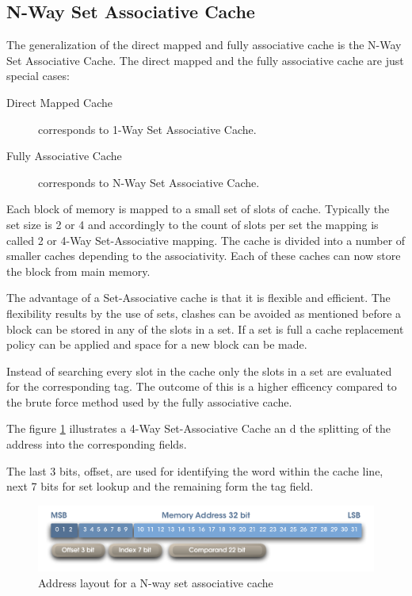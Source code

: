 \documentclass[DIV10, abstracton, openright, footsepline, headsepline, twoside, 9pt,
bigheadings]{scrreprt}
\begin{document}
\subsection{N-Way Set Associative Cache}
The generalization of the direct mapped and fully associative cache is the N-Way
Set Associative Cache. The direct mapped and the fully associative cache are
just special cases:
\begin{description}
\item[Direct Mapped Cache] corresponds to 1-Way Set Associative Cache.
\item[Fully Associative Cache] corresponds to N-Way Set Associative Cache.
\end{description}
Each block of memory is mapped to a small set of slots of cache.
Typically the set size is 2 or 4 and accordingly to the count of slots per set
the mapping is called 2 or 4-Way Set-Associative mapping. The cache is divided
into a number of smaller caches depending to the associativity. Each of these
caches can now store the block from main memory.

The advantage of a Set-Associative cache is that it is flexible and
efficient. The flexibility results by the use of sets, clashes can be avoided as
mentioned before a block can be stored in any of the slots in a set. If a set is
full a cache replacement policy can be applied and space for a new block can be
made.

Instead of searching every slot in the cache only the slots in a set are
evaluated for the corresponding tag. The outcome of this is a higher efficency
compared to the brute force method used by the fully associative
cache.

The figure \ref{fig:addsplit_nfa} illustrates a 4-Way Set-Associative Cache an
d the splitting of the address into the corresponding fields.

The last 3 bits, offset, are used for identifying the word within the cache
line, next 7 bits for set lookup and the remaining form the tag field.

\begin{figure}[H]
\centering
\includegraphics[width=\textwidth]{diagramme/addsplit_nfa}
\caption{Address layout for a N-way set associative cache}
\label{fig:addsplit_nfa}
\end{figure}
\end{document}
